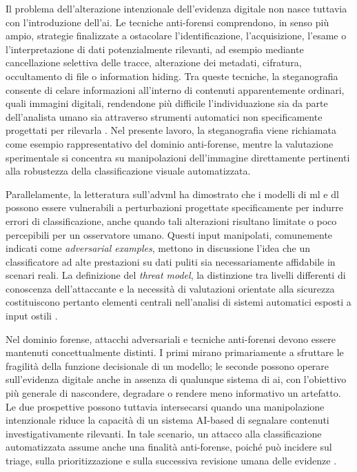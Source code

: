 Il problema dell'alterazione intenzionale dell'evidenza digitale non nasce tuttavia con l'introduzione dell'\gls{ai}. Le tecniche anti-forensi comprendono, in senso più ampio, strategie finalizzate a ostacolare l'identificazione, l'acquisizione, l'esame o l'interpretazione di dati potenzialmente rilevanti, ad esempio mediante cancellazione selettiva delle tracce, alterazione dei metadati, cifratura, occultamento di file o information hiding. Tra queste tecniche, la steganografia consente di celare informazioni all'interno di contenuti apparentemente ordinari, quali immagini digitali, rendendone più difficile l'individuazione sia da parte dell'analista umano sia attraverso strumenti automatici non specificamente progettati per rilevarla \cite{yaacoub2021digital,sanna2025cybercrime}. Nel presente lavoro, la steganografia viene richiamata come esempio rappresentativo del dominio anti-forense, mentre la valutazione sperimentale si concentra su manipolazioni dell'immagine direttamente pertinenti alla robustezza della classificazione visuale automatizzata.

Parallelamente, la letteratura sull'\gls{advml} ha dimostrato che i modelli di \gls{ml} e \gls{dl} possono essere vulnerabili a perturbazioni progettate specificamente per indurre errori di classificazione, anche quando tali alterazioni risultano limitate o poco percepibili per un osservatore umano. Questi input manipolati, comunemente indicati come \emph{adversarial examples}, mettono in discussione l'idea che un classificatore ad alte prestazioni su dati puliti sia necessariamente affidabile in scenari reali. La definizione del \emph{threat model}, la distinzione tra livelli differenti di conoscenza dell'attaccante e la necessità di valutazioni orientate alla sicurezza costituiscono pertanto elementi centrali nell'analisi di sistemi automatici esposti a input ostili \cite{goodfellow2015explaining,carlini2017towards,biggio2018wild,nowroozi2021survey}.

Nel dominio forense, attacchi adversariali e tecniche anti-forensi devono essere mantenuti concettualmente distinti. I primi mirano primariamente a sfruttare le fragilità della funzione decisionale di un modello; le seconde possono operare sull'evidenza digitale anche in assenza di qualunque sistema di \gls{ai}, con l'obiettivo più generale di nascondere, degradare o rendere meno informativo un artefatto. Le due prospettive possono tuttavia intersecarsi quando una manipolazione intenzionale riduce la capacità di un sistema AI-based di segnalare contenuti investigativamente rilevanti. In tale scenario, un attacco alla classificazione automatizzata assume anche una finalità anti-forense, poiché può incidere sul triage, sulla prioritizzazione e sulla successiva revisione umana delle evidenze \cite{sanna2024preliminary,sanna2025pixelperfect}.

